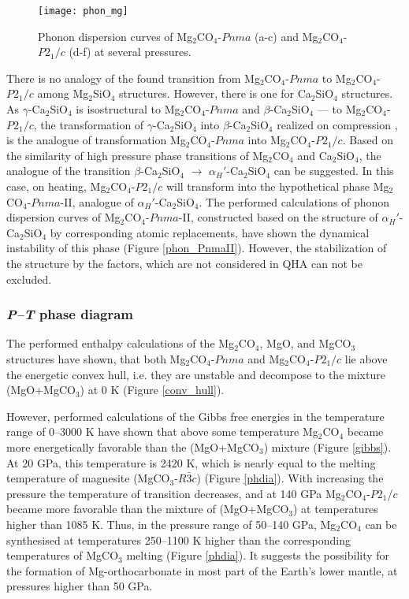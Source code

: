 \documentclass[a4paperm]{article}
\begin{document}
\begin{figure}[H]
	\texttt{[image: phon\_mg]} \centering
	\caption{Phonon dispersion curves of Mg$_2$CO$_4$-$Pnma$ (a-c) and Mg$_2$CO$_4$-$P2_1/c$ (d-f) at several pressures.
	} 	\label{phon_mg2co4_main}
\end{figure}



There is no analogy of the found transition from Mg$_2$CO$_4$-$Pnma$ to Mg$_2$CO$_4$-$P2_1/c$ among Mg$_2$SiO$_4$ structures.
However, there is one for Ca$_2$SiO$_4$ structures.
As $\gamma$-Ca$_2$SiO$_4$ is isostructural to Mg$_2$CO$_4$-$Pnma$ and $\beta$-Ca$_2$SiO$_4$ --- to Mg$_2$CO$_4$-$P2_1/c$, the transformation of $\gamma$-Ca$_2$SiO$_4$ into $\beta$-Ca$_2$SiO$_4$ realized on compression \cite{belmonte2017}, is the analogue of transformation Mg$_2$CO$_4$-$Pnma$ into Mg$_2$CO$_4$-$P2_1/c$. 
Based on the similarity of high pressure phase transitions of Mg$_2$CO$_4$ and Ca$_2$SiO$_4$, the analogue of the transition $\beta$-Ca$_2$SiO$_4$ $\to$ $\alpha_H'$-Ca$_2$SiO$_4$ can be suggested.
In this case, on heating, Mg$_2$CO$_4$-$P2_1/c$ will transform into the hypothetical phase Mg$_2$CO$_4$-$Pnma$-II, analogue of $\alpha_H'$-Ca$_2$SiO$_4$.
The performed calculations of phonon dispersion curves of Mg$_2$CO$_4$-$Pnma$-II, constructed based on the structure of $\alpha_H'$-Ca$_2$SiO$_4$ by corresponding atomic replacements, have shown the dynamical instability of this phase (Figure \ref{phon_PnmaII}).
However, the stabilization of the structure by the factors, which are not considered in QHA can not be excluded.




\subsubsection*{{\it P--T} phase diagram}

The performed enthalpy calculations of the Mg$_2$CO$_4$, MgO, and MgCO$_3$ structures have shown, that both Mg$_2$CO$_4$-$Pnma$ and Mg$_2$CO$_4$-$P2_1/c$ lie above the energetic convex hull, i.e. they are unstable and decompose to the mixture (MgO+MgCO$_3$) at 0 K (Figure \ref{conv_hull}).

However, performed calculations of the Gibbs free energies in the temperature range of 0--3000 K have shown that above some temperature  Mg$_2$CO$_4$ became more energetically favorable than the (MgO+MgCO$_3$) mixture (Figure \ref{gibbs}).
At 20 GPa, this temperature is 2420 K, which is nearly equal to the melting temperature of  magnesite (MgCO$_3$-$R\bar{3}c$) \cite{solopova2015} (Figure \ref{phdia}).
With increasing the pressure the temperature of transition decreases, and at 140 GPa Mg$_2$CO$_4$-$P$2$_1$/$c$ became more favorable than the mixture of (MgO+MgCO$_3$) at temperatures higher than 1085 K.
Thus, in the pressure range of 50--140 GPa, Mg$_2$CO$_4$ can be synthesised at temperatures 250--1100 K higher than the corresponding temperatures of MgCO$_3$ melting (Figure \ref{phdia}). 
It suggests the possibility for the formation of Mg-orthocarbonate in most part of the Earth's lower mantle, at pressures higher than 50 GPa.
\end{document}
